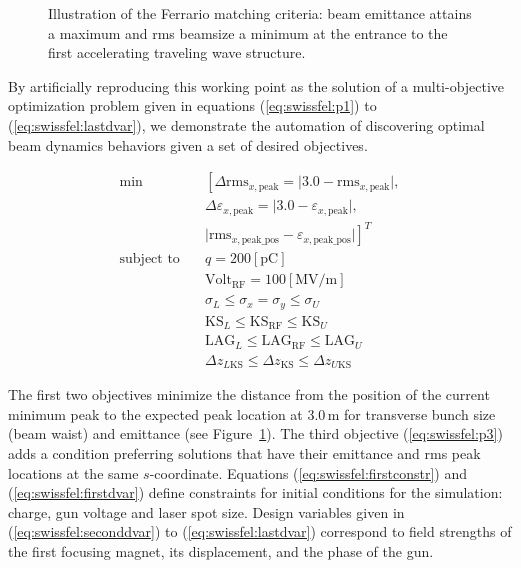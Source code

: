 \begin{figure}
  \centering
  
  \caption{Illustration of the Ferrario matching criteria: beam emittance
  attains a maximum and rms beamsize a minimum at the entrance to the first
  accelerating traveling wave structure.}
  \label{fig:fer_match}
\end{figure}

By artificially reproducing this working point as the solution of a
  multi-objective optimization problem given in equations
  (\ref{eq:swissfel:p1}) to (\ref{eq:swissfel:lastdvar}),
  we demonstrate the automation of discovering optimal beam dynamics behaviors
  given a set of desired objectives.

\begin{align}
  \text{min}  \quad & \left[ \Delta \text{rms}_{x,\text{peak}} = \vert 3.0 -
  \text{rms}_{x,\text{peak}} \vert, \right. \label{eq:swissfel:p1}\\
                    & \Delta \varepsilon_{x,\text{peak}}  = \vert 3.0 -
                    \varepsilon_{x,\text{peak}} \vert, \label{eq:swissfel:p2}\\
                    & \left. \vert \text{rms}_{x, \text{peak\_pos}} -
                    \varepsilon_{x,\text{peak\_pos}} \vert
                    \label{eq:swissfel:p3} \right]^T\\
  \text{subject to} \quad & q = 200 \left[\text{pC}\right] \label{eq:swissfel:firstconstr}\\
              \quad & \text{Volt}_{\text{RF}} = 100 \left[\text{MV/m}\right] \label{eq:swissfel:lastconstr}\\
              \quad & \sigma_{L} \leq \sigma_x = \sigma_y \leq \sigma_{U} \label{eq:swissfel:firstdvar}\\
              \quad & \text{KS}_{L} \leq \text{KS}_{\text{RF}} \leq \text{KS}_{U} \label{eq:swissfel:seconddvar}\\
              \quad & \text{LAG}_{L} \leq \text{LAG}_{\text{RF}} \leq \text{LAG}_{U} \\
              \quad & \Delta z_{L\text{KS}} \leq \Delta z_{\text{KS}} \leq \Delta z_{U\text{KS}} \label{eq:swissfel:lastdvar}
\end{align}

The first two objectives minimize the distance from the position of the current
  minimum peak to the expected peak location at $3.0$\,m for transverse bunch
  size (beam waist) and emittance (see Figure~\ref{fig:fer_match}).
The third objective (\ref{eq:swissfel:p3}) adds a condition preferring
  solutions that have their emittance and rms peak locations at the same
  $s$-coordinate.
Equations (\ref{eq:swissfel:firstconstr}) and (\ref{eq:swissfel:firstdvar})
  define constraints for initial conditions for the simulation: charge,
  gun voltage and laser spot size.
Design variables given in (\ref{eq:swissfel:seconddvar}) to
  (\ref{eq:swissfel:lastdvar}) correspond to field strengths of the
  first focusing magnet, its displacement, and the phase of the gun.

